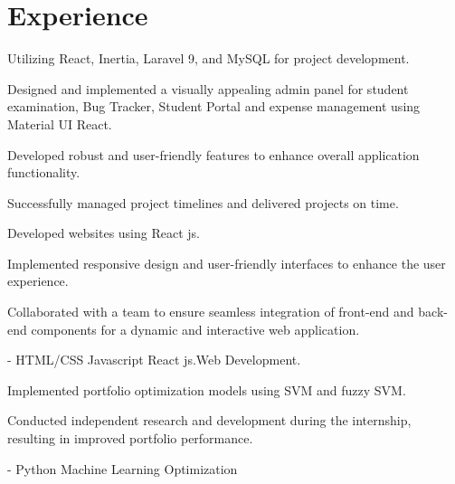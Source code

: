 \documentclass[]{deedy-resume-openfont}
\begin{document}
        \section{Experience}
        \hfill {}
            \vspace{4pt}
\begin{tightemize}
\item Utilizing React, Inertia, Laravel 9, and MySQL for project development.
\item Designed and implemented a visually appealing admin panel for student examination, Bug Tracker, Student Portal and expense management using Material UI React.
\item Developed robust and user-friendly features to enhance overall application functionality.
\item Successfully managed project timelines and delivered projects on time.
\end{tightemize}
            \sectionsep
        \hfill {}
            \vspace{4pt}
\begin{tightemize}
\item Developed websites using React js.
\item Implemented responsive design and user-friendly interfaces to enhance the user experience.
\item Collaborated with a team to ensure seamless integration of front-end and back-end components for a dynamic and interactive web application.
\item  {} - HTML/CSS \textbar{}Javascript \textbar{}React js.\textbar{}Web Development.
\end{tightemize}
            \sectionsep
        \hfill {}
            \vspace{4pt}
\begin{tightemize}
\item Implemented portfolio optimization models using SVM and fuzzy SVM.
\item Conducted independent research and development during the internship, resulting in improved portfolio performance.
\item  {} - Python \textbar{} Machine Learning \textbar{} Optimization
\end{tightemize}
            \sectionsep
%
%
\end{document}
